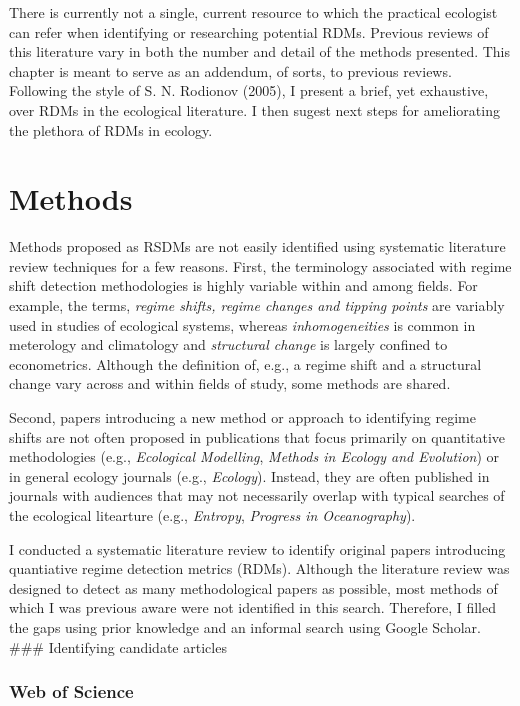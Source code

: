\documentclass[12pt,twoside,openany]{reedthesis}
\begin{document}
There is currently not a single, current resource to which the practical
ecologist can refer when identifying or researching potential RDMs.
Previous reviews of this literature vary in both the number and detail
of the methods presented. This chapter is meant to serve as an addendum,
of sorts, to previous reviews. Following the style of S. N. Rodionov
(2005), I present a brief, yet exhaustive, over RDMs in the ecological
literature. I then sugest next steps for ameliorating the plethora of
RDMs in ecology.

\section{Methods}\label{methods}

Methods proposed as RSDMs are not easily identified using systematic
literature review techniques for a few reasons. First, the terminology
associated with regime shift detection methodologies is highly variable
within and among fields. For example, the terms, \emph{regime shifts,
regime changes and tipping points} are variably used in studies of
ecological systems, whereas \emph{inhomogeneities} is common in
meterology and climatology and \emph{structural change} is largely
confined to econometrics. Although the definition of, e.g., a regime
shift and a structural change vary across and within fields of study,
some methods are shared.

Second, papers introducing a new method or approach to identifying
regime shifts are not often proposed in publications that focus
primarily on quantitative methodologies (e.g., \emph{Ecological
Modelling}, \emph{Methods in Ecology and Evolution}) or in general
ecology journals (e.g., \emph{Ecology}). Instead, they are often
published in journals with audiences that may not necessarily overlap
with typical searches of the ecological litearture (e.g.,
\emph{Entropy}, \emph{Progress in Oceanography}).

I conducted a systematic literature review to identify original papers
introducing quantiative regime detection metrics (RDMs). Although the
literature review was designed to detect as many methodological papers
as possible, most methods of which I was previous aware were not
identified in this search. Therefore, I filled the gaps using prior
knowledge and an informal search using Google Scholar. \#\#\#
Identifying candidate articles

\subsubsection{Web of Science}\label{web-of-science}
\end{document}
